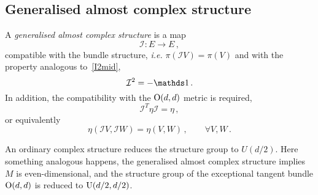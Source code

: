 \documentclass[debug]{phd}
\begin{document}
				\subsection{Generalised almost complex structure}
						A \emph{generalised almost complex structure} is a map
								\begin{equation}
									\mathcal{I} : E \longrightarrow E \, ,
								\end{equation}
						compatible with the bundle structure, \emph{i.e.} $\pi( \mathcal{I} V) = \pi(V)$ and with the property analogous to~\eqref{I2mid},
								\begin{equation}
									\mathcal{I}^2 = - \id \, .
								\end{equation}
						In addition, the compatibility with the $\mathrm{O}(d,d)$ metric is required,
								\begin{equation}\label{hermeta}
									\mathcal{I}^T \eta \mathcal{I} = \eta \, ,
								\end{equation}
						or equivalently
								\begin{equation}\label{hermeta2}
									\eta(\mathcal{I} V, \mathcal{I} W) = \eta (V, W) \, , \qquad \forall V, W \, .
								\end{equation}
						
						An ordinary complex structure reduces the structure group to $U(d/2)$. 
						Here something analogous happens, the generalised almost complex structure implies $M$ is even-dimensional, and the structure group of the exceptional tangent bundle $\mathrm{O}(d,d)$ is reduced to $\mathrm{U}(d/2, d/2)$. 
						
\end{document}
